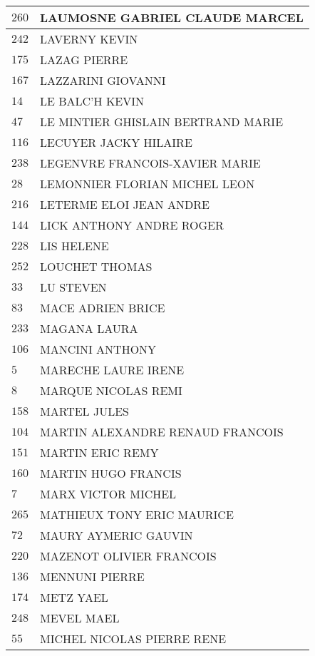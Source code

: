 \begin{xltabular}{\linewidth}{|l|X|}
    \hline
    $260$ & LAUMOSNE GABRIEL CLAUDE MARCEL \\
    \hline
    $242$ & LAVERNY KEVIN \\
    \hline
    $175$ & LAZAG PIERRE \\
    \hline
    $167$ & LAZZARINI GIOVANNI \\
    \hline
    $14$ & LE BALC'H KEVIN \\
    \hline
    $47$ & LE MINTIER GHISLAIN BERTRAND MARIE \\
    \hline
    $116$ & LECUYER JACKY HILAIRE \\
    \hline
    $238$ & LEGENVRE FRANCOIS-XAVIER MARIE \\
    \hline
    $28$ & LEMONNIER FLORIAN MICHEL LEON \\
    \hline
    $216$ & LETERME ELOI JEAN ANDRE \\
    \hline
    $144$ & LICK ANTHONY ANDRE ROGER \\
    \hline
    $228$ & LIS HELENE \\
    \hline
    $252$ & LOUCHET THOMAS \\
    \hline
    $33$ & LU STEVEN \\
    \hline
    $83$ & MACE ADRIEN BRICE \\
    \hline
    $233$ & MAGANA LAURA \\
    \hline
    $106$ & MANCINI ANTHONY \\
    \hline
    $5$ & MARECHE LAURE IRENE \\
    \hline
    $8$ & MARQUE NICOLAS REMI \\
    \hline
    $158$ & MARTEL JULES \\
    \hline
    $104$ & MARTIN ALEXANDRE RENAUD FRANCOIS \\
    \hline
    $151$ & MARTIN ERIC REMY \\
    \hline
    $160$ & MARTIN HUGO FRANCIS \\
    \hline
    $7$ & MARX VICTOR MICHEL \\
    \hline
    $265$ & MATHIEUX TONY ERIC MAURICE \\
    \hline
    $72$ & MAURY AYMERIC GAUVIN \\
    \hline
    $220$ & MAZENOT OLIVIER FRANCOIS \\
    \hline
    $136$ & MENNUNI PIERRE \\
    \hline
    $174$ & METZ YAEL \\
    \hline
    $248$ & MEVEL MAEL \\
    \hline
    $55$ & MICHEL NICOLAS PIERRE RENE \\

\end{xltabular}
